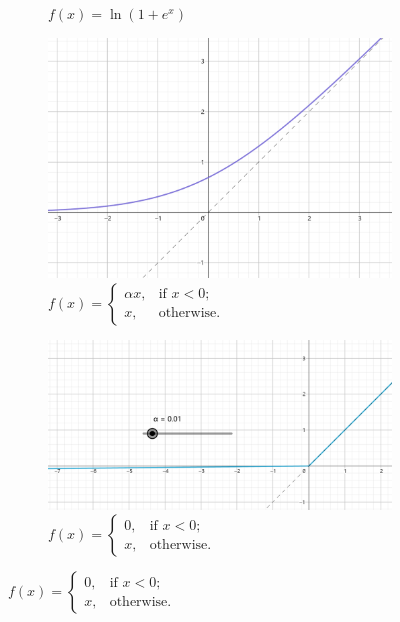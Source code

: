 \documentclass[8pt]{article}
\begin{document}
\begin{figure}[H]
\begin{subfigure}{0.32\textwidth}
        \caption{$f(x) = \ln(1 + e^x)$}
        \label{fig:softplus}
    \end{subfigure}
    \hfill
    \newline
    \begin{subfigure}{0.32\textwidth}
        \centering
        \includegraphics[width=\textwidth]{../Prob3/img/f4.png}
        \caption{
            $f(x) = \begin{cases}
                \alpha x, & \text{if } x < 0; \\
                x, & \text{otherwise}.
            \end{cases}$
        }
        \label{fig:leaky_relu}
    \end{subfigure}
    \hspace{0pt}
    \begin{subfigure}{0.42\textwidth}
        \centering
        \includegraphics[width=\textwidth]{../Prob3/img/f5.png}
        \caption{$f(x) = \begin{cases}
            0, & \text{if } x < 0; \\
            x, & \text{otherwise}.
            \end{cases}$}
        \label{fig:ReLU}
    \end{subfigure}
    \hfill
\end{figure}
\end{document}
